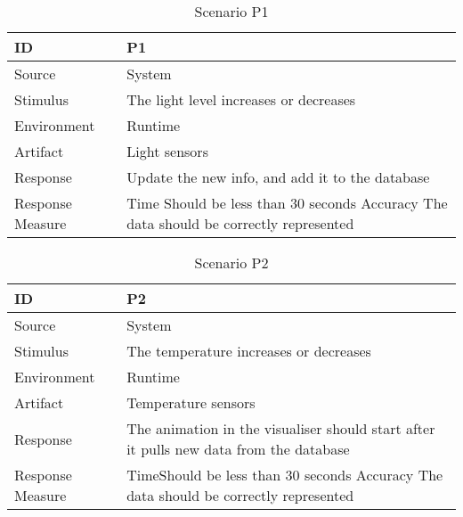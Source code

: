 \documentclass[../document.tex]{subfiles}
\begin{document}
\begin{table}[H]
	\caption{Scenario P1}
	\begin{tabularx}{\textwidth}{|X|X|}
		\hline
		ID					& P1 \\ \hline
		Source				& System \\ \hline
		Stimulus			& The light level increases or decreases \\ \hline
		Environment			& Runtime \\ \hline
		Artifact			& Light sensors \\ \hline
		Response			& Update the new info, and add it to the database \\ \hline
		Response Measure	& Time \newline Should be less than 30 seconds \newline Accuracy \newline The data should be correctly represented
		\\ \hline
	\end{tabularx}
\end{table}

\begin{table}[H]
	\caption{Scenario P2}
	\begin{tabularx}{\textwidth}{|X|X|}
		\hline
		ID					& P2 \\ \hline
		Source				& System \\ \hline
		Stimulus			& The temperature increases or decreases \\ \hline
		Environment			& Runtime \\ \hline
		Artifact			& Temperature sensors \\ \hline
		Response			& The animation in the visualiser should start after it pulls new data from the database \\ \hline
		Response Measure	& Time\newline Should be less than 30 seconds \newline Accuracy \newline The data should be correctly represented
		\\ \hline
	\end{tabularx}
\end{table}
\end{document}
